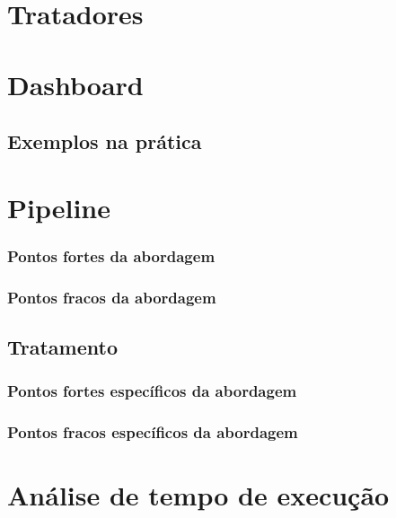 \documentclass[a4paper,12pt]{article}
\begin{document}
\section{Tratadores}

\section{Dashboard}

\subsection*{Exemplos na prática}

\section{Pipeline}

\subsubsection*{Pontos fortes da abordagem}

\subsubsection*{Pontos fracos da abordagem}

\subsection*{Tratamento}

\subsubsection*{Pontos fortes específicos da abordagem}

\subsubsection*{Pontos fracos específicos da abordagem}

\section{Análise de tempo de execução}
\end{document}
